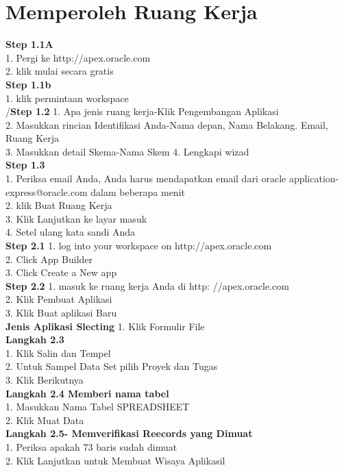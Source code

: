 \documentclass [12pt, times new roman, a4paper]{article}
\begin{document}
\section{Memperoleh Ruang Kerja}
\textbf{Step 1.1A}\\
1. Pergi ke http://apex.oracle.com\\
2. klik mulai secara gratis\\
\textbf{Step 1.1b}\\
1. klik permintaan workspace\\
/\textbf{Step 1.2}
1. Apa jenis ruang kerja-Klik Pengembangan Aplikasi\\
2. Masukkan rincian Identifikasi Anda-Nama depan, Nama Belakang. Email, Ruang Kerja\\
3. Masukkan detail Skema-Nama Skem
4. Lengkapi wizad\\
\textbf{Step 1.3}\\
1. Periksa email Anda, Anda harus mendapatkan email dari oracle application-express@oracle.com dalam beberapa menit\\
2. klik Buat Ruang Kerja\\
3. Klik Lanjutkan ke layar masuk\\
4. Setel ulang kata sandi Anda\\
\textbf{Step 2.1}
1. log into your workspace on http://apex.oracle.com\\
2. Click App Builder\\
3. Click Create a New app\\
\textbf{Step 2.2}
1. masuk ke ruang kerja Anda di http: //apex.oracle.com \\
2. Klik Pembuat Aplikasi \\
3. Klik Buat aplikasi Baru \\
\textbf{Jenis Aplikasi Slecting} 
1. Klik Formulir File \\
\textbf{Langkah 2.3} \\
1. Klik Salin dan Tempel \\
2. Untuk Sampel Data Set pilih Proyek dan Tugas \\
3. Klik Berikutnya \\
\textbf{Langkah 2.4 Memberi nama tabel} \\
1. Masukkan Nama Tabel {SPREADSHEET} \\
2. Klik Muat Data \\
\textbf{Langkah 2.5- Memverifikasi Reecords yang Dimuat}\\
1. Periksa apakah 73 baris sudah dimuat \\
2. Klik Lanjutkan untuk Membuat Wisaya Aplikasil \\
\end{document}
